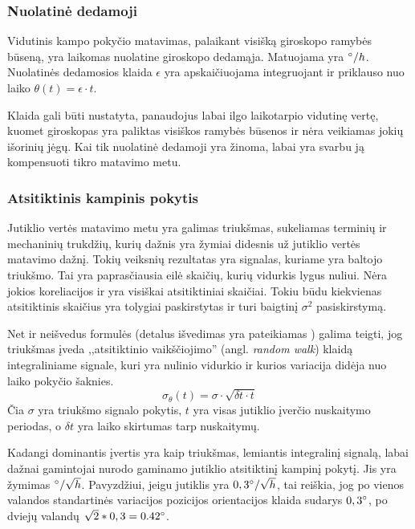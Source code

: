 \subsubsection{Nuolatinė dedamoji}

Vidutinis kampo pokyčio matavimas, palaikant visišką giroskopo ramybės būseną, yra laikomas nuolatine giroskopo dedamąja. 
Matuojama yra $\degree/h$. 
Nuolatinės dedamosios klaida $\epsilon$ yra apskaičiuojama integruojant ir priklauso nuo laiko $\theta(t) = \epsilon \cdot t$.

Klaida gali būti nustatyta, panaudojus labai ilgo laikotarpio vidutinę vertę, kuomet giroskopas yra paliktas visiškos ramybės būsenos ir nėra veikiamas jokių išorinių jėgų. 
Kai tik nuolatinė dedamoji yra žinoma, labai yra svarbu ją kompensuoti tikro matavimo metu.

\subsubsection{Atsitiktinis kampinis pokytis}

Jutiklio vertės matavimo metu yra galimas triukšmas, sukeliamas terminių ir mechaninių trukdžių, kurių dažnis yra žymiai didesnis už jutiklio vertės matavimo dažnį.
Tokių veiksnių rezultatas yra signalas, kuriame yra baltojo triukšmo. 
Tai yra paprasčiausia eilė skaičių, kurių vidurkis lygus nuliui.
Nėra jokios koreliacijos ir yra visiškai atsitiktiniai skaičiai. 
Tokiu būdu kiekvienas atsitiktinis skaičius yra tolygiai paskirstytas ir turi baigtinį $\sigma^2$ pasiskirstymą.

Net ir neišvedus formulės (detalus išvedimas yra pateikiamas \cite{woodman2007introduction}) galima teigti, jog triukšmas įveda ,,atsitiktinio vaikščiojimo'' (angl. \textit{random walk}) klaidą integraliniame signale, kuri yra nulinio vidurkio ir kurios variacija didėja nuo laiko pokyčio šaknies.
\begin{equation}
    \sigma_{\theta} (t) = \sigma \cdot \sqrt{ \delta t \cdot t}
\end{equation}
Čia $\sigma$ yra triukšmo signalo pokytis, $t$ yra visas jutiklio įverčio nuskaitymo periodas, o $\delta t$ yra laiko skirtumas tarp nuskaitymų.

Kadangi dominantis įvertis yra kaip triukšmas, lemiantis integralinį signalą, labai dažnai gamintojai nurodo gaminamo jutiklio atsitiktinį kampinį pokytį. Jis yra žymimas $\degree/\sqrt{h}$. 
Pavyzdžiui, jeigu jutiklis yra $0,3\degree / \sqrt{h}$, tai reiškia, jog po vienos valandos standartinės variacijos pozicijos orientacijos klaida sudarys $0,3\degree$, po dviejų valandų $\sqrt{2} * 0,3 = 0.42 \degree$.

